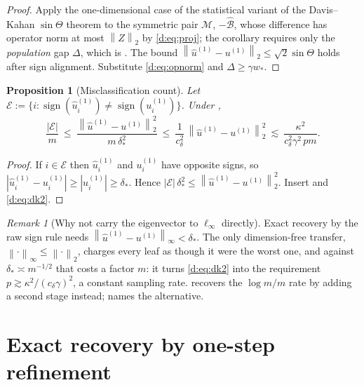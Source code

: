 \documentclass[11pt]{article}
\theoremstyle{plain}
\newtheorem{proposition}{Proposition}
\theoremstyle{definition}
\theoremstyle{remark}
\newtheorem{remark}{Remark}
\providecommand{\Bop}{\mathcal{B}}           %
\providecommand{\Mop}{\mathcal{M}}           %
\providecommand{\uone}{u^{(1)}}
\providecommand{\huone}{\hat u^{(1)}}
\providecommand{\1}{\mathbf{1}}
\providecommand{\norm}[1]{\left\lVert #1 \right\rVert}
\providecommand{\opnorm}[1]{\norm{#1}_{2}}
\newcommand{\wst}{w_{*}}
\begin{document}
\begin{proof}
Apply the one-dimensional case of the statistical variant
\cite[Cor.~1]{yu2015useful} of the Davis--Kahan $\sin\Theta$ theorem
\cite{davis1970rotation} to the symmetric pair $\Mop$, $-\widehat{\Bop}$,
whose difference has operator norm at most $\opnorm{Z}$ by
\eqref{d:eq:proj}; the corollary requires only the \emph{population} gap
$\Delta$, which is . The bound
$\norm{\huone-\uone}_2\le\sqrt2\sin\Theta$ holds after sign alignment. Substitute
\eqref{d:eq:opnorm} and $\Delta\ge\gamma\wst$.
\end{proof}

\begin{proposition}[Misclassification count]\label{d:prop:misclass}
Let $\mathcal{E}:=\{i:\operatorname{sign}(\huone_i)\ne\operatorname{sign}(\uone_i)\}$.
Under ,
\begin{equation}\label{d:eq:misclass}
  \frac{|\mathcal{E}|}{m}\ \le\ \frac{\norm{\huone-\uone}_2^2}{m\,\delta_*^2}
  \ \le\ \frac{1}{c_\delta^2}\,\norm{\huone-\uone}_2^2
  \ \lesssim\ \frac{\kappa^2}{c_\delta^2\gamma^2\,pm}.
\end{equation}
\end{proposition}

\begin{proof}
If $i\in\mathcal{E}$ then $\huone_i$ and $\uone_i$ have opposite signs, so
$|\huone_i-\uone_i|\ge|\uone_i|\ge\delta_*$. Hence
$|\mathcal{E}|\,\delta_*^2\le\norm{\huone-\uone}_2^2$. Insert
 and \eqref{d:eq:dk2}.
\end{proof}

\begin{remark}[Why not carry the eigenvector to $\ell_\infty$ directly]
\label{d:rem:linf}
Exact recovery by the raw sign rule needs
$\norm{\huone-\uone}_\infty<\delta_*$. The only dimension-free transfer,
$\norm{\cdot}_\infty\le\norm{\cdot}_2$, charges every leaf as though it were the
worst one, and against $\delta_*\asymp m^{-1/2}$ that costs a factor $m$: it
turns \eqref{d:eq:dk2} into the requirement $p\gtrsim\kappa^2/(c_\delta\gamma)^2$,
a constant sampling rate.  recovers the $\log m/m$ rate by
adding a second stage instead;  names the alternative.
\end{remark}

\section{Exact recovery by one-step refinement}\label{d:sec:exact}
\end{document}
